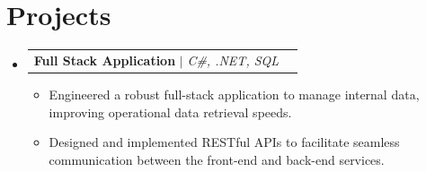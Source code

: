 \documentclass[letterpaper,11pt]{article}
\makeatletter
\newcommand{\resumeItem}[1]{
\item\small{
{#1 \vspace{-2pt}}
}
}
\newcommand{\resumeProjectHeading}[2]{
\item
\begin{tabular*}{0.97\textwidth}{l@{\extracolsep{\fill}}r}
\small#1 & #2 \\
\end{tabular*}\vspace{-7pt}
}
\newcommand{\resumeSubHeadingListStart}{\begin{itemize}[leftmargin=0.15in, label={}]}
\newcommand{\resumeSubHeadingListEnd}{\end{itemize}}
\newcommand{\resumeItemListStart}{\begin{itemize}}
\newcommand{\resumeItemListEnd}{\end{itemize}\vspace{-5pt}}
\makeatother
\begin{document}
\section{Projects}
\resumeSubHeadingListStart
\resumeProjectHeading{\textbf{Full Stack Application} $|$ \emph{C\#, .NET, SQL}}{}
\resumeItemListStart
\resumeItem{Engineered a robust full-stack application to manage internal data, improving operational data retrieval speeds.}
\resumeItem{Designed and implemented RESTful APIs to facilitate seamless communication between the front-end and back-end services.}
\resumeItemListEnd
\resumeSubHeadingListEnd
\end{document}
